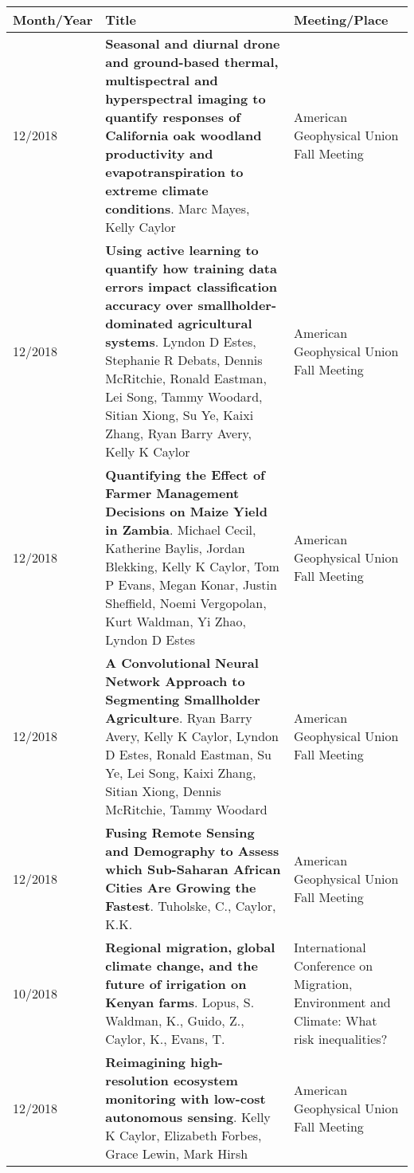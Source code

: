 
\begin{longtable}{lp{10.0cm}p{4.5cm}}
Month/Year & Title & Meeting/Place\\
\hline 
\endhead
 
12/2018 & {\bf Seasonal and diurnal drone and ground-based thermal, multispectral and hyperspectral imaging to quantify responses of California oak woodland productivity and evapotranspiration to extreme climate conditions}. Marc Mayes, Kelly Caylor  & American Geophysical Union Fall Meeting \\
  
12/2018 & {\bf Using active learning to quantify how training data errors impact classification accuracy over smallholder-dominated agricultural systems}. Lyndon D Estes, Stephanie R Debats, Dennis McRitchie, Ronald Eastman, Lei Song, Tammy Woodard, Sitian Xiong, Su Ye, Kaixi Zhang, Ryan Barry Avery, Kelly K Caylor  & American Geophysical Union Fall Meeting \\
  
12/2018 & {\bf Quantifying the Effect of Farmer Management Decisions on Maize Yield in Zambia}. Michael Cecil, Katherine Baylis, Jordan Blekking, Kelly K Caylor, Tom P Evans, Megan Konar, Justin Sheffield, Noemi Vergopolan, Kurt Waldman, Yi Zhao, Lyndon D Estes  & American Geophysical Union Fall Meeting \\
  
12/2018 & {\bf A Convolutional Neural Network Approach to Segmenting Smallholder Agriculture}. Ryan Barry Avery, Kelly K Caylor, Lyndon D Estes, Ronald Eastman, Su Ye, Lei Song, Kaixi Zhang, Sitian Xiong, Dennis McRitchie, Tammy Woodard  & American Geophysical Union Fall Meeting \\
  
12/2018 & {\bf Fusing Remote Sensing and Demography to Assess which Sub-Saharan African Cities Are Growing the Fastest}. Tuholske, C., Caylor, K.K.  & American Geophysical Union Fall Meeting \\
  
10/2018 & {\bf Regional migration, global climate change,
and the future of irrigation on Kenyan farms}. Lopus, S. Waldman, K., Guido, Z., Caylor, K., Evans, T.  & International Conference on Migration, Environment and Climate: What risk inequalities?  \\
  
12/2018 & {\bf Reimagining high-resolution ecosystem monitoring with low-cost autonomous sensing}. Kelly K Caylor, Elizabeth Forbes, Grace Lewin, Mark Hirsh  & American Geophysical Union Fall Meeting \\
  

\end{longtable}

